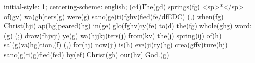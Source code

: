 initial-style: 1;
centering-scheme: english;
(c4)The(gd) springs(fg) <sp>*</sp> of(gv) wa(gh)ters(g) were(g) sanc(ge)ti(fghv)fied(fe/dfEDC) (,) when(fg) Christ(hji) ap(hg)peared(hg) in(ge) glo(fghv)ry(fe) to(d) the(fg) whole(ghg) word:(g) (;) draw(fhjvji) ye(g) wa(hjjkj)ters(j) from(kv) the(j) spring(ij) of(h) sal(g)va(hg)tion,(f) (,) for(hj) now(ji) is(h) eve(ji)ry(hg) crea(gffv)ture(hj) sanc(g)ti(g)fied(fed) by(ef) Christ(gh) our(hv) God.(g)
